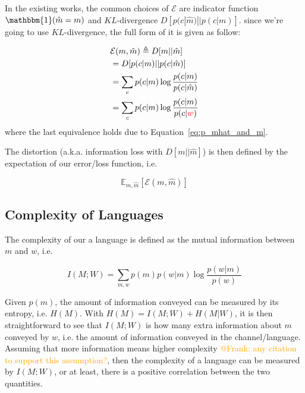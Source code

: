 \documentclass[11pt]{article}
\begin{document}
In the existing works, the common choices of $\mathcal{E}$ are indicator function $\mathbbm{1}(\hat{m}=m)$ and $KL$-divergence $D[p(c|\hat{m})||p(c|m)]$.
since we're going to use $KL$-divergence, the full form of it is given as follow:

\begin{equation}
\begin{split}
    & \mathcal{E}(m,\hat{m}) \triangleq  D[m||\hat{m}] \\
    & = D[p(c|m)||p(c|\hat{m})]  \\
    & = \sum_{c} p(c|m) \log \frac{p(c|m)}{p(c|\hat{m})} \\
     & = \sum_{c} p(c|m) \log \frac{p(c|m)}{p(c|\textcolor{red}{w})}
\end{split}
\label{eq:comm_loss_function}
\end{equation}
where the last equivalence holds due to Equation~\ref{eq:p_mhat_and_m}.

The distortion (a.k.a. information loss with $D[m||\hat{m}]$) is then defined by the expectation of our error/loss function, i.e.

\begin{equation}
    \mathbb{E}_{m,\hat{m}}\left[\mathcal{E}(m,\hat{m})\right]
    \label{eq:distortion}
\end{equation}


\subsection{Complexity of Languages}
\label{ssec:complexity}

The complexity of our a language is defined as the mutual information between $m$ and $w$, i.e. 

\begin{equation}
    I(M;W) = \sum_{m,w} p(m)p(w|m)\log \frac{p(w|m)}{p(w)}
    \label{eq:complexity_definition}
\end{equation}

Given $p(m)$, the amount of information conveyed can be measured by its entropy, i.e. $H(M)$.
With $H(M)=I(M;W)+H(M|W)$, it is then straightforward to see that $I(M;W)$ is how many extra information about $m$ conveyed by $w$, i.e. the amount of information conveyed in the channel/language.
Assuming that more information means higher complexity \textcolor{orange}{@Frank: any citation to support this assumption?}, then the complexity of a language can be measured by $I(M;W)$,
or at least, there is a positive correlation between the two quantities.
\end{document}
